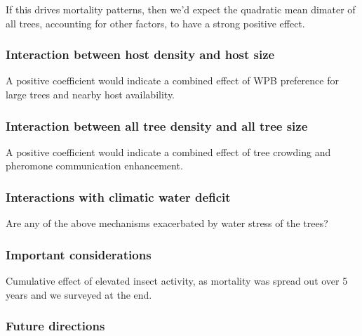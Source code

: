 \documentclass[]{article}
\begin{document}
If this drives mortality patterns, then we'd expect the quadratic mean
dimater of all trees, accounting for other factors, to have a strong
positive effect.

\subsubsection{Interaction between host density and host
size}\label{interaction-between-host-density-and-host-size}

A positive coefficient would indicate a combined effect of WPB
preference for large trees and nearby host availability.

\subsubsection{Interaction between all tree density and all tree
size}\label{interaction-between-all-tree-density-and-all-tree-size}

A positive coefficient would indicate a combined effect of tree crowding
and pheromone communication enhancement.

\subsubsection{Interactions with climatic water
deficit}\label{interactions-with-climatic-water-deficit}

Are any of the above mechanisms exacerbated by water stress of the
trees?

\subsubsection{Important considerations}\label{important-considerations}

Cumulative effect of elevated insect activity, as mortality was spread
out over 5 years and we surveyed at the end.

\subsubsection{Future directions}\label{future-directions}
\end{document}
